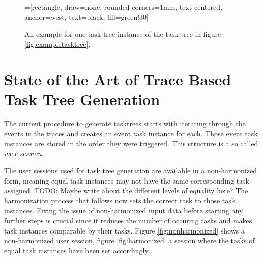 	\begin{figure}
		=[rectangle, draw=none, rounded corners=1mm,
		        text centered, anchor=west, text=black, fill=green!30]
		
		\caption{An example for one task tree instance of the task tree in figure \ref{fig:exampletasktree}\cite{harms2013}.}
		\label{fig:exampletaskinstancetree}
	\end{figure}

\section{State of the Art of Trace Based Task Tree Generation}
The current procedure to generate tasktrees\cite{harms2013} starts with iterating through the events in the traces and creates an event task instance for each. 
Those event task instances are stored in the order they were triggered.  This structure is a so called \textit{user session}.

The user sessions used for task tree generation are available in a non-harmonized form,
meaning equal task instances may not have the same corresponding task assigned. TODO: Maybe write about the different levels of equality here?
The harmonization process that follows now sets the correct task to those task instances.
Fixing the issue of non-harmonized input data before starting any further steps is crucial since it reduces the number of occuring tasks and makes task instances
comparable by their tasks. Figure \ref{fig:nonharmonized} shows a non-harmonized user session, figure \ref{fig:harmonized} a session where the tasks of equal task instances have been set accordingly.

